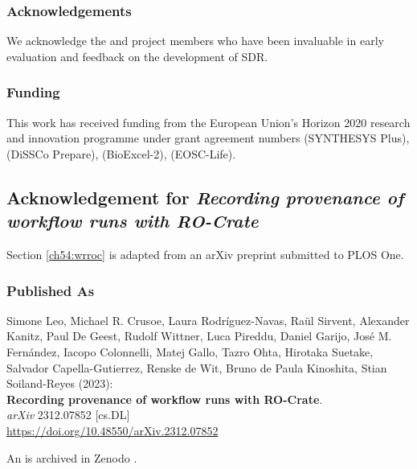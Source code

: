 \subsubsection*{Acknowledgements}

We acknowledge the  and
 project members who have been
invaluable in early evaluation and feedback on the development of SDR.

\subsubsection*{Funding}

This work has received funding from the European Union's Horizon 2020
research and innovation programme under grant agreement numbers
(SYNTHESYS Plus),  (DiSSCo
Prepare),  (BioExcel-2),
 (EOSC-Life).



\subsection{Acknowledgement for \emph{Recording provenance of workflow runs with RO-Crate}}
\label{ch11:wrroc}

Section \vref{ch54:wrroc} is adapted from an arXiv preprint submitted to PLOS One.

\subsubsection*{Published As}

Simone Leo, Michael R. Crusoe, Laura Rodríguez-Navas, Raül Sirvent, Alexander Kanitz, Paul De Geest, Rudolf Wittner, Luca Pireddu, Daniel Garijo, José M. Fernández, Iacopo Colonnelli, Matej Gallo, Tazro Ohta, Hirotaka Suetake, Salvador Capella-Gutierrez, Renske de Wit, Bruno de Paula Kinoshita, Stian Soiland-Reyes (2023): \\
\textbf{Recording provenance of workflow runs with RO-Crate}.\\
\emph{arXiv} 2312.07852 [cs.DL] \\
\url{https://doi.org/10.48550/arXiv.2312.07852}

An  is archived in Zenodo \cite{Leo 2023c}.


